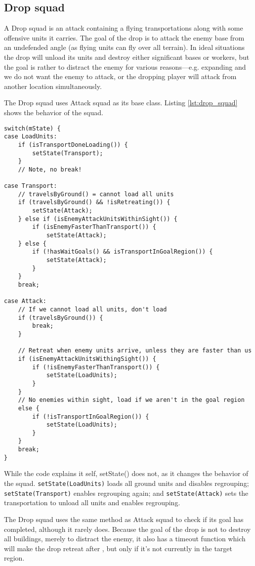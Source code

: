 \subsection{Drop squad}
\label{sec:drop_squad}
A Drop squad is an attack containing a flying transportations along with some offensive units it
carries. The goal of the drop is to attack the enemy base from an undefended angle (as flying units
can fly over all terrain). In ideal situations the drop will unload its units and destroy either
significant bases or workers, but the goal is rather to distract the enemy for various reasons—e.g.
expanding and we do not want the enemy to attack, or the dropping player will attack from another
location simultaneously.

The Drop squad uses Attack squad as its base class. Listing \ref{lst:drop_squad} shows the behavior of the squad.

\clearpage
\begin{lstlisting}[caption={Drop squad behavior},label={lst:drop_squad}]
switch(mState) {
case LoadUnits:
	if (isTransportDoneLoading()) {
		setState(Transport);
	}
	// Note, no break!

case Transport:
	// travelsByGround() = cannot load all units
	if (travelsByGround() && !isRetreating()) {
		setState(Attack);
	} else if (isEnemyAttackUnitsWithinSight()) {
		if (isEnemyFasterThanTransport()) {
			setState(Attack);
	} else {
		if (!hasWaitGoals() && isTransportInGoalRegion()) {
			setState(Attack);
		}
	}
	break;

case Attack:
	// If we cannot load all units, don't load
	if (travelsByGround()) {
		break;
	}

	// Retreat when enemy units arrive, unless they are faster than us
	if (isEnemyAttackUnitsWithingSight()) {
		if (!isEnemyFasterThanTransport()) {
			setState(LoadUnits);
		}
	}
	// No enemies within sight, load if we aren't in the goal region
	else {
		if (!isTransportInGoalRegion()) {
			setState(LoadUnits);
		}
	}
	break;
}
\end{lstlisting}
While the code explains it self, setState() does not, as it changes the behavior of the squad. \texttt{setState(LoadUnits)} loads all ground units and disables regrouping; \texttt{setState(Transport)} enables regrouping again; and \texttt{setState(Attack)} sets the transportation to unload all units and enables regrouping.

The Drop squad uses the same method as Attack squad to check if its goal has completed, although it rarely does. Because the goal of the drop is not to destroy all buildings, merely to distract the enemy, it also has a timeout function which will make the drop retreat after \squadDropAttackTimeout, but only if it's not currently in the target region.

